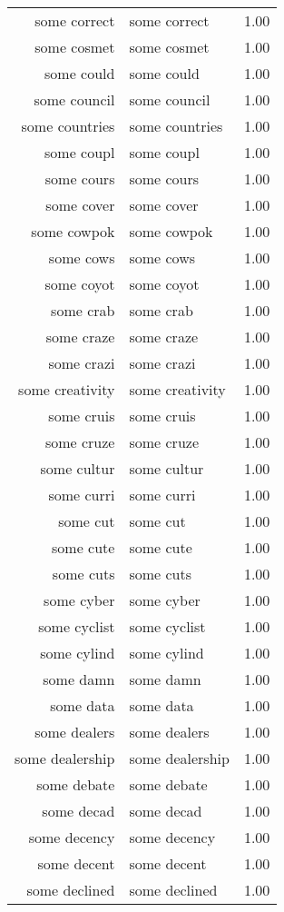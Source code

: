 \begin{table}[ht]
\begin{tabular}{rlr}
  some correct & some correct & 1.00 \\ 
  some cosmet & some cosmet & 1.00 \\ 
  some could & some could & 1.00 \\ 
  some council & some council & 1.00 \\ 
  some countries & some countries & 1.00 \\ 
  some coupl & some coupl & 1.00 \\ 
  some cours & some cours & 1.00 \\ 
  some cover & some cover & 1.00 \\ 
  some cowpok & some cowpok & 1.00 \\ 
  some cows & some cows & 1.00 \\ 
  some coyot & some coyot & 1.00 \\ 
  some crab & some crab & 1.00 \\ 
  some craze & some craze & 1.00 \\ 
  some crazi & some crazi & 1.00 \\ 
  some creativity & some creativity & 1.00 \\ 
  some cruis & some cruis & 1.00 \\ 
  some cruze & some cruze & 1.00 \\ 
  some cultur & some cultur & 1.00 \\ 
  some curri & some curri & 1.00 \\ 
  some cut & some cut & 1.00 \\ 
  some cute & some cute & 1.00 \\ 
  some cuts & some cuts & 1.00 \\ 
  some cyber & some cyber & 1.00 \\ 
  some cyclist & some cyclist & 1.00 \\ 
  some cylind & some cylind & 1.00 \\ 
  some damn & some damn & 1.00 \\ 
  some data & some data & 1.00 \\ 
  some dealers & some dealers & 1.00 \\ 
  some dealership & some dealership & 1.00 \\ 
  some debate & some debate & 1.00 \\ 
  some decad & some decad & 1.00 \\ 
  some decency & some decency & 1.00 \\ 
  some decent & some decent & 1.00 \\ 
  some declined & some declined & 1.00 \\ 

\end{tabular}
\end{table}
